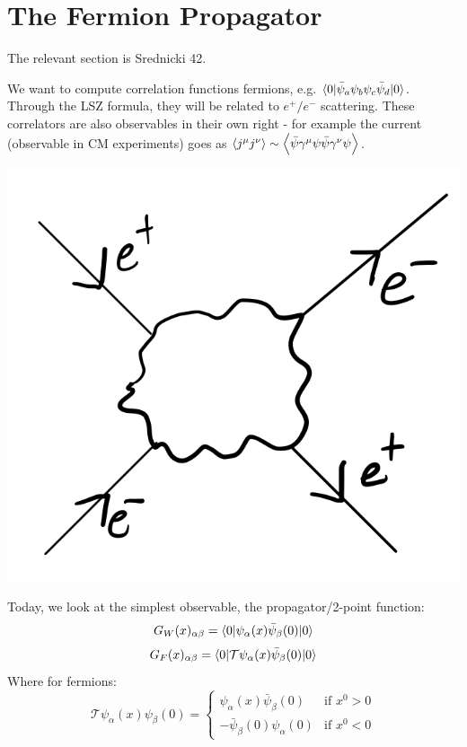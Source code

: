 \section{The Fermion Propagator}
The relevant section is Srednicki 42.

We want to compute correlation functions fermions, e.g. $\langle 0 \rvert\bar{\psi}_a\psi_b\psi_c\bar{\psi}_d\lvert 0 \rangle$. Through the LSZ formula, they will be related to $e^+/e^-$ scattering. These correlators are also observables in their own right - for example the current (observable in CM experiments) goes as $\left< j^\mu j^\nu \right> \sim \left< \bar{\psi}\gamma^\mu \psi \bar{\psi}\gamma^\nu \psi \right>$.

\begin{center}
    \includegraphics[scale=0.3]{Lectures/Images/lec5-elecpositscattering.png}
\end{center}

Today, we look at the simplest observable, the propagator/2-point function:
\begin{equation}
    G_W(x)_{\alpha\beta} = \langle 0 \rvert\psi_\alpha(x)\bar{\psi}_\beta(0)\lvert 0 \rangle
\end{equation}
\begin{equation}
    G_F(x)_{\alpha\beta} =  \langle 0 \rvert\mathcal{T}\psi_\alpha(x)\bar{\psi}_\beta(0)\lvert 0 \rangle
\end{equation}
Where for fermions:
\begin{equation}
    \mathcal{T}\psi_\alpha(x)\psi_\beta(0) = \begin{cases}
        \psi_\alpha(x)\bar{\psi}_\beta(0) & \text{if $x^0 > 0$}
        \\ -\bar{\psi}_\beta(0)\psi_\alpha(0) & \text{if $x^0 < 0$}
    \end{cases}
\end{equation}

